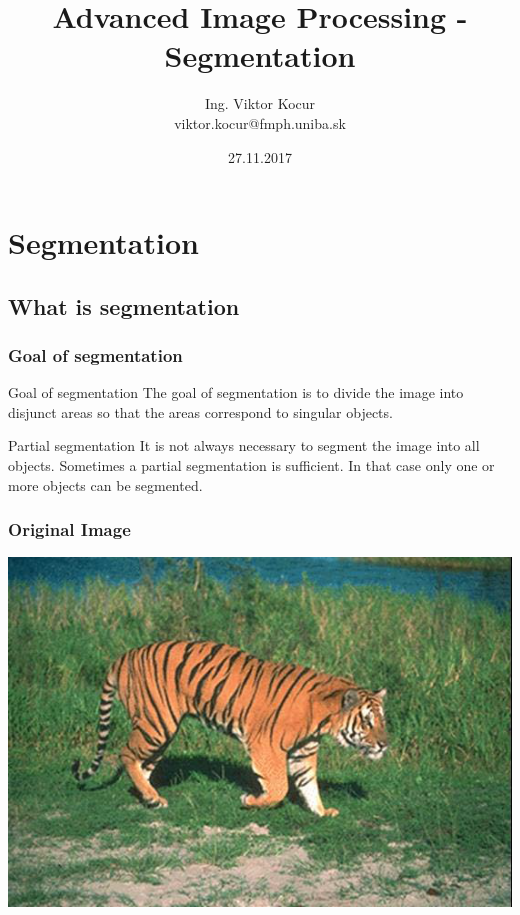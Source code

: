 \documentclass{beamer}
\title[10. cvičenie]{Advanced Image Processing - Segmentation}
\author[Kocur]{Ing. Viktor Kocur \\{\small viktor.kocur@fmph.uniba.sk}}
\institute{DAI FMFI UK}
\date{27.11.2017}
\begin{document}


\begin{frame}

  \titlepage

\end{frame}

\section{Segmentation}
\subsection{What is segmentation}

\begin{frame}
\frametitle{Goal of segmentation}
\begin{block}{Goal of segmentation}
The goal of segmentation is to divide the image into disjunct areas so that the areas correspond to singular objects.
\end{block}

\begin{block}{Partial segmentation}
It is not always necessary to segment the image into all objects. Sometimes a partial segmentation is sufficient. In that case only one or more objects can be segmented.

\end{block}
\end{frame}

\begin{frame}
\frametitle{Original Image}
\includegraphics[width=\textwidth]{tiger.png}
\end{frame}
\end{document}
